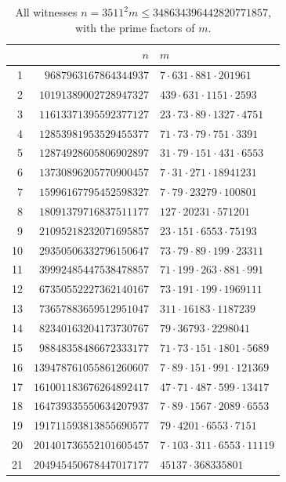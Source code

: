 \documentclass[11pt]{amsart}
\theoremstyle{remark}
\begin{document}
\begin{table}[t]
\centering
\small
\caption{All witnesses $n=3511^{2}m\le 348634396442820771857$, with the prime factors of
$m$.}
\label{tab:list}
\begin{tabular}{@{}rrl@{}}
\toprule
& $n$ & $m$\\
\midrule
1 & $9687963167864344937$ & $7\cdot 631\cdot 881\cdot 201961$\\
2 & $10191389002728947327$ & $439\cdot 631\cdot 1151\cdot 2593$\\
3 & $11613371395592377127$ & $23\cdot 73\cdot 89\cdot 1327\cdot 4751$\\
4 & $12853981953529455377$ & $71\cdot 73\cdot 79\cdot 751\cdot 3391$\\
5 & $12874928605806902897$ & $31\cdot 79\cdot 151\cdot 431\cdot 6553$\\
6 & $13730896205770900457$ & $7\cdot 31\cdot 271\cdot 18941231$\\
7 & $15996167795452598327$ & $7\cdot 79\cdot 23279\cdot 100801$\\
8 & $18091379716837511177$ & $127\cdot 20231\cdot 571201$\\
9 & $21095218232071695857$ & $23\cdot 151\cdot 6553\cdot 75193$\\
10 & $29350506332796150647$ & $73\cdot 79\cdot 89\cdot 199\cdot 23311$\\
11 & $39992485447538478857$ & $71\cdot 199\cdot 263\cdot 881\cdot 991$\\
12 & $67350552227362140167$ & $73\cdot 191\cdot 199\cdot 1969111$\\
13 & $73657883659512951047$ & $311\cdot 16183\cdot 1187239$\\
14 & $82340163204173730767$ & $79\cdot 36793\cdot 2298041$\\
15 & $98848358486672333177$ & $71\cdot 73\cdot 151\cdot 1801\cdot 5689$\\
16 & $139478761055861260607$ & $7\cdot 89\cdot 151\cdot 991\cdot 121369$\\
17 & $161001183676264892417$ & $47\cdot 71\cdot 487\cdot 599\cdot 13417$\\
18 & $164739335550634207937$ & $7\cdot 89\cdot 1567\cdot 2089\cdot 6553$\\
19 & $191711593813855690577$ & $79\cdot 4201\cdot 6553\cdot 7151$\\
20 & $201401736552101605457$ & $7\cdot 103\cdot 311\cdot 6553\cdot 11119$\\
21 & $204945450678447017177$ & $45137\cdot 368335801$\\

\end{tabular}
\end{table}
\end{document}
